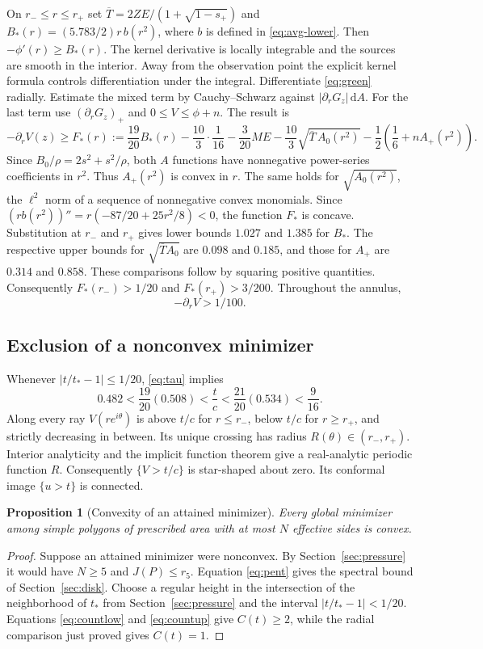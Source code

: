 \documentclass[11pt,a4paper,reqno]{amsart}
\newtheorem{proposition}[theorem]{Proposition}
\theoremstyle{remark}
\numberwithin{equation}{section}
\newcommand{\dd}{\,\mathrm d}
\begin{document}
On $r_-\le r\le r_+$ set
$\overline T=2ZE/(1+\sqrt{1-s_+})$ and
$B_*(r)=(5.783/2)r\,b(r^2)$, where $b$ is defined in \eqref{eq:avg-lower}.
Then $-\phi'(r)\ge B_*(r)$. The kernel derivative is locally integrable
and the sources are smooth in the interior. Away from the observation point
the explicit kernel formula controls differentiation under the integral.
Differentiate \eqref{eq:green} radially. Estimate the mixed term by
Cauchy--Schwarz against $|\partial_rG_z|\dd A$. For the last term use
$(\partial_rG_z)_+$ and $0\le V\le\phi+n$. The result is
\begin{equation}\label{eq:slope-unified}
  -\partial_r V(z)\ge F_*(r):=\frac{19}{20}B_*(r)-\frac{10}{3}\cdot\frac{1}{16}
    -\frac{3}{20}ME-\frac{10}{3}\sqrt{\overline T\,A_0(r^2)}
    -\frac12\left(\frac16+nA_+(r^2)\right).
\end{equation}
Since $B_0/\rho=2s^2+s^2/\rho$, both $A$ functions have nonnegative
power-series coefficients in $r^2$. Thus $A_+(r^2)$ is convex in $r$.
The same holds for $\sqrt{A_0(r^2)}$, the $\ell^2$ norm of a sequence
of nonnegative convex monomials. Since
$(rb(r^2))''=r(-87/20+25r^2/8)<0$, the function $F_*$ is concave.
Substitution at $r_-$ and $r_+$ gives lower bounds $1.027$ and $1.385$
for $B_*$. The respective upper bounds for $\sqrt{\overline T A_0}$ are
$0.098$ and $0.185$, and those for $A_+$ are $0.314$ and $0.858$.
These comparisons follow by squaring positive quantities.
Consequently $F_*(r_-)>1/20$ and $F_*(r_+)>3/200$. Throughout the annulus,
\[
                         -\partial_rV>1/100 .
\]

\subsection{Exclusion of a nonconvex minimizer}
Whenever $|t/t_*-1|\le1/20$, \eqref{eq:tau} implies
\[
  0.482<\frac{19}{20}(0.508)<\frac{t}{c}<\frac{21}{20}(0.534)<\frac{9}{16}.
\]
Along every ray $V(re^{i\theta})$ is above $t/c$ for $r\le r_-$, below
$t/c$ for $r\ge r_+$, and strictly decreasing in between. Its unique
crossing has radius $R(\theta)\in(r_-,r_+)$. Interior analyticity and the
implicit function theorem give a real-analytic periodic function $R$.
Consequently $\{V>t/c\}$ is star-shaped about zero. Its conformal image
$\{u>t\}$ is connected.

\begin{proposition}[Convexity of an attained minimizer]\label{prop:attained}
Every global minimizer among simple polygons of prescribed area with at
most $N$ effective sides is convex.
\end{proposition}
\begin{proof}
Suppose an attained minimizer were nonconvex. By Section~\ref{sec:pressure}
it would have $N\ge5$ and $J(P)\le r_5$. Equation \eqref{eq:pent} gives the
spectral bound of Section~\ref{sec:disk}. Choose a regular height in the
intersection of the neighborhood of $t_*$ from Section~\ref{sec:pressure}
and the interval $|t/t_*-1|<1/20$. Equations \eqref{eq:countlow} and
\eqref{eq:countup} give $C(t)\ge2$, while the radial comparison just proved
gives $C(t)=1$.
\end{proof}
\end{document}
